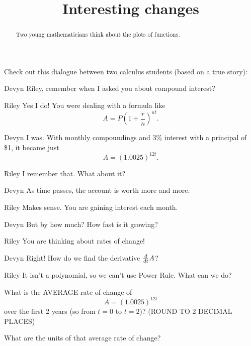 \documentclass{ximera}
\title[Break-Ground:]{Interesting changes}
\begin{document}
\begin{abstract}
  Two young mathematicians think about the plots of functions.
\end{abstract}
\maketitle

Check out this dialogue between two calculus students (based on a true
story):

\begin{dialogue}
\item[Devyn] Riley, remember when I asked you about compound interest?
\item[Riley] Yes I do!  You were dealing with a formula like \[ A = P\left( 1 + \dfrac{r}{n} \right)^{nt}.\]
\item[Devyn] I was.  With monthly compoundings and 3\% interest with a principal of \$1, it became just
			\[ A = (1.0025)^{12t}.\]
\item[Riley] I remember that. What about it?
\item[Devyn] As time passes, the account is worth more and more.
\item[Riley] Makes sense.  You are gaining interest each month.
\item[Devyn] But by how much?  How fast is it growing?
\item[Riley] You are thinking about rates of change!  
\item[Devyn] Right!  How do we find the derivative $\frac{d}{\mathop{}\!d t}{A}$?
\item[Riley] It isn't a polynomial, so we can't use Power Rule.  What can we do?

\end{dialogue}

\begin{problem}
  What is the AVERAGE rate of change of \[A = (1.0025)^{12t}\] over the first 2 years (so from $t=0$ to $t=2$)?  (ROUND TO 2 DECIMAL PLACES)
  \begin{multipleChoice}
  \end{multipleChoice}
\end{problem}

\begin{problem}
  What are the units of that average rate of change?
    \begin{multipleChoice}
  \end{multipleChoice}
\end{problem}


%
\end{document}
